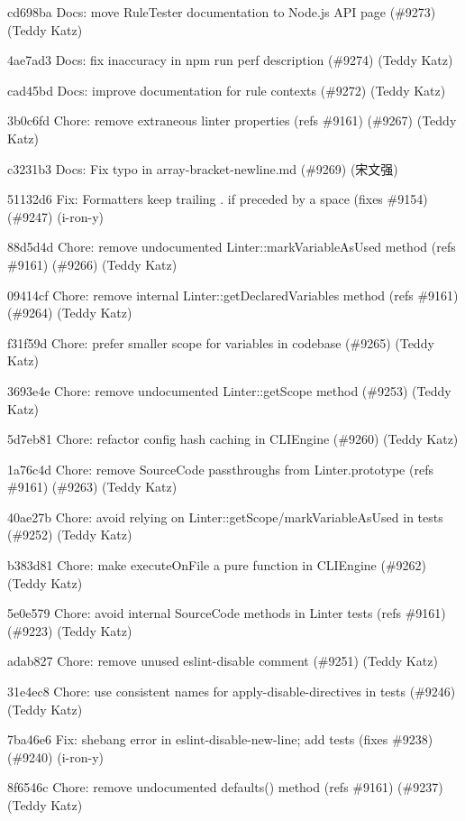 \begin{DoxyItemize}
\item cd698ba Docs\+: move Rule\+Tester documentation to Node.\+js API page (\#9273) (Teddy Katz)
\item 4ae7ad3 Docs\+: fix inaccuracy in {\ttfamily npm run perf} description (\#9274) (Teddy Katz)
\item cad45bd Docs\+: improve documentation for rule contexts (\#9272) (Teddy Katz)
\item 3b0c6fd Chore\+: remove extraneous linter properties (refs \#9161) (\#9267) (Teddy Katz)
\item c3231b3 Docs\+: Fix typo in array-\/bracket-\/newline.\+md (\#9269) (宋文强)
\item 51132d6 Fix\+: Formatters keep trailing \textquotesingle{}.\textquotesingle{} if preceded by a space (fixes \#9154) (\#9247) (i-\/ron-\/y)
\item 88d5d4d Chore\+: remove undocumented Linter\+::mark\+Variable\+As\+Used method (refs \#9161) (\#9266) (Teddy Katz)
\item 09414cf Chore\+: remove internal Linter\+::get\+Declared\+Variables method (refs \#9161) (\#9264) (Teddy Katz)
\item f31f59d Chore\+: prefer smaller scope for variables in codebase (\#9265) (Teddy Katz)
\item 3693e4e Chore\+: remove undocumented Linter\+::get\+Scope method (\#9253) (Teddy Katz)
\item 5d7eb81 Chore\+: refactor config hash caching in CLIEngine (\#9260) (Teddy Katz)
\item 1a76c4d Chore\+: remove Source\+Code passthroughs from Linter.\+prototype (refs \#9161) (\#9263) (Teddy Katz)
\item 40ae27b Chore\+: avoid relying on Linter\+::get\+Scope/mark\+Variable\+As\+Used in tests (\#9252) (Teddy Katz)
\item b383d81 Chore\+: make execute\+On\+File a pure function in CLIEngine (\#9262) (Teddy Katz)
\item 5e0e579 Chore\+: avoid internal Source\+Code methods in Linter tests (refs \#9161) (\#9223) (Teddy Katz)
\item adab827 Chore\+: remove unused eslint-\/disable comment (\#9251) (Teddy Katz)
\item 31e4ec8 Chore\+: use consistent names for apply-\/disable-\/directives in tests (\#9246) (Teddy Katz)
\item 7ba46e6 Fix\+: shebang error in eslint-\/disable-\/new-\/line; add tests (fixes \#9238) (\#9240) (i-\/ron-\/y)
\item 8f6546c Chore\+: remove undocumented defaults() method (refs \#9161) (\#9237) (Teddy Katz)

\end{DoxyItemize}
